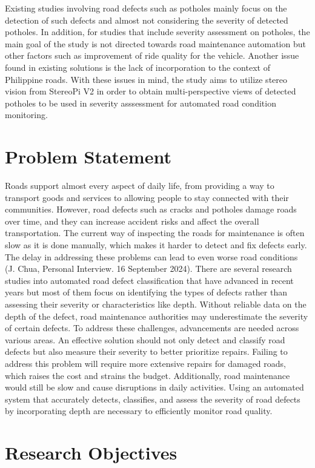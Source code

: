 Existing studies involving road defects such as potholes mainly focus on the detection of such defects and almost not considering the severity of detected potholes. In addition, for studies that include severity assessment on potholes, the main goal of the study is not directed towards road maintenance automation but other factors such as improvement of ride quality for the vehicle. Another issue found in existing solutions is the lack of incorporation to the context of Philippine roads. With these issues in mind, the study aims to utilize stereo vision from StereoPi V2 in order to obtain multi-perspective views of detected potholes to be used in severity asssessment for automated road condition monitoring.


\section{Problem Statement}
Roads support almost every aspect of daily life, from providing a way to transport goods and services to allowing people to stay connected with their communities. However, road defects such as cracks and potholes damage roads over time, and they can increase accident risks and affect the overall transportation. The current way of inspecting the roads for maintenance is often slow as it is done manually, which makes it harder to detect and fix defects early. The delay in addressing these problems can lead to even worse road conditions (J. Chua, Personal Interview. 16 September 2024). There are several research studies into automated road defect classification that have advanced in recent years but most of them focus on identifying the types of defects rather than assessing their severity or characteristics like depth. Without reliable data on the depth of the defect, road maintenance authorities may underestimate the severity of certain defects. To address these challenges, advancements are needed across various areas. An effective solution should not only detect and classify road defects but also measure their severity to better prioritize repairs. Failing to address this problem will require more extensive repairs for damaged roads, which raises the cost and strains the budget. Additionally, road maintenance would still be slow and cause disruptions in daily activities. Using an automated system that accurately detects, classifies, and assess the severity of road defects by incorporating depth are necessary to efficiently monitor road quality.


\section{Research Objectives}
\label{sec:researchobjectives}

